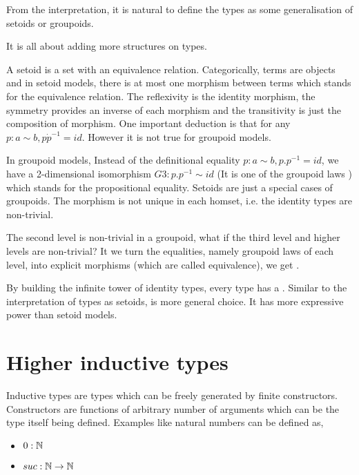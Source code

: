From the interpretation, it is natural to define the types as some
generalisation of setoids or groupoids.

It is all about adding more structures on types. 

A setoid is a set with
an equivalence relation. Categorically, terms are objects and in setoid models, there is at most one morphism
between terms which stands for the equivalence relation.
The reflexivity is the identity morphism, the symmetry provides an
inverse of each morphism and the transitivity is just the composition
of morphism. One important deduction is that for any $p : a \sim b, p
\dot p^{-1} = id$. However it is not true for groupoid models.

In groupoid models, Instead of the definitional equality $p : a \sim
b, p . p^{-1} = id$, we have a 2-dimensional isomorphism $G3 : p . p^{-1}
\sim id$ (It is one of the groupoid laws \cite{MR1686862}) which
stands for the propositional equality.
Setoids are just a special cases of groupoids. The morphism is not
unique in each homset, i.e. the identity types are
non-trivial.

The second level is non-trivial in a groupoid, what if the third level
and higher levels are non-trivial? It we turn the equalities, namely
groupoid laws of each level, into explicit morphisms (which are called
equivalence), we get \og.

By building the infinite tower of identity types, every type has a \wog \cite{van2011types}.
Similar to the interpretation of types as setoids, \wog is more
general choice. It has more expressive power than setoid models.


\section{Higher inductive types}

Inductive types are types which can be freely generated by finite
constructors. Constructors are functions of arbitrary number of
arguments which can be the type itself being defined. Examples like
natural numbers can be defined as,

\begin{itemize}
\item $0 : \mathbb{N}$
\item $suc : \mathbb{N} \rightarrow \mathbb{N}$
\end{itemize}


